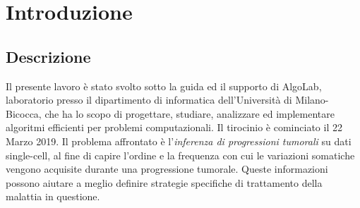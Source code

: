 \chapter{Introduzione}
\section{Descrizione}
Il presente lavoro è stato svolto sotto la guida ed il supporto di AlgoLab, laboratorio presso il dipartimento di informatica dell'Università di Milano-Bicocca, che ha lo scopo di progettare, studiare, analizzare ed implementare algoritmi efficienti per problemi computazionali. Il tirocinio è cominciato il 22 Marzo 2019.
Il problema affrontato è l'\textit{inferenza di progressioni tumorali} su dati single-cell, al fine di capire l'ordine e la frequenza con cui le variazioni somatiche vengono acquisite durante una progressione tumorale. Queste informazioni possono aiutare a meglio definire strategie specifiche di trattamento della malattia in questione.